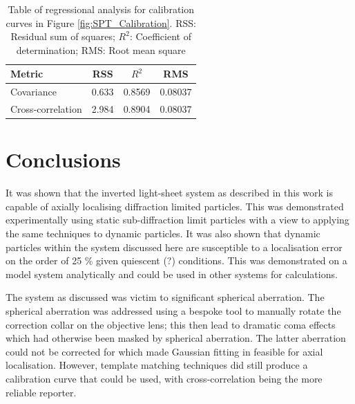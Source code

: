 \begin{table}[h]
  \label{tab:linear_calibration}
\centering
\caption{Table of regressional analysis for calibration curves in Figure \ref{fig:SPT_Calibration}.
RSS: Residual sum of squares; $R^2$: Coefficient of determination; RMS: Root mean square}
  \begin{tabular}{lccc}
    \toprule
    Metric & RSS & $R^2$ & RMS \\\midrule
    Covariance & 0.633 & 0.8569 & 0.08037 \\
    Cross-correlation & 2.984 & 0.8904 & 0.08037 \\
    \bottomrule
  \end{tabular}
\end{table}



\section{Conclusions}

It was shown that the inverted light-sheet system as described in this work is capable of axially localising diffraction limited particles.
This was demonstrated experimentally using static sub-diffraction limit particles with a view to applying the same techniques to dynamic particles.
It was also shown that dynamic particles within the system discussed here are susceptible to a localisation error on the order of 25 \% given quiescent (?) conditions.
This was demonstrated on a model system analytically and could be used in other systems for calculations.

The system as discussed was victim to significant spherical aberration.
The spherical aberration was addressed using a bespoke tool to manually rotate the correction collar on the objective lens; this then lead to dramatic coma effects which had otherwise been masked by spherical aberration.
The latter aberration could not be corrected for which made Gaussian fitting in feasible for axial localisation.
However, template matching techniques did still produce a calibration curve that could be used, with cross-correlation being the more reliable reporter.


